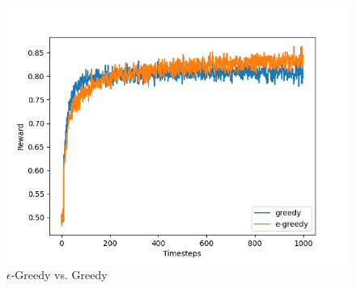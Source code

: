 \documentclass{article}
\begin{document}
\begin{figure}[h]
    \includegraphics[scale=0.8]{Figure_1.png}
    \caption{$\epsilon$-Greedy vs. Greedy}
    \label{fig:comparison}
\end{figure}
\end{document}
